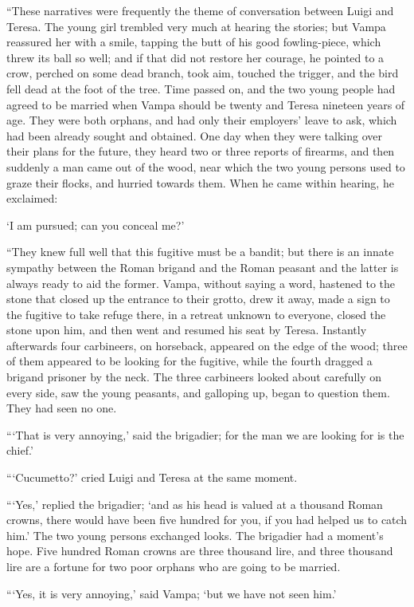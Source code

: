 “These narratives were frequently the theme of conversation between
Luigi and Teresa. The young girl trembled very much at hearing the
stories; but Vampa reassured her with a smile, tapping the butt of his
good fowling-piece, which threw its ball so well; and if that did not
restore her courage, he pointed to a crow, perched on some dead branch,
took aim, touched the trigger, and the bird fell dead at the foot of
the tree. Time passed on, and the two young people had agreed to be
married when Vampa should be twenty and Teresa nineteen years of age.
They were both orphans, and had only their employers’ leave to ask,
which had been already sought and obtained. One day when they were
talking over their plans for the future, they heard two or three
reports of firearms, and then suddenly a man came out of the wood, near
which the two young persons used to graze their flocks, and hurried
towards them. When he came within hearing, he exclaimed:

‘I am pursued; can you conceal me?’

“They knew full well that this fugitive must be a bandit; but there is
an innate sympathy between the Roman brigand and the Roman peasant and
the latter is always ready to aid the former. Vampa, without saying a
word, hastened to the stone that closed up the entrance to their
grotto, drew it away, made a sign to the fugitive to take refuge there,
in a retreat unknown to everyone, closed the stone upon him, and then
went and resumed his seat by Teresa. Instantly afterwards four
carbineers, on horseback, appeared on the edge of the wood; three of
them appeared to be looking for the fugitive, while the fourth dragged
a brigand prisoner by the neck. The three carbineers looked about
carefully on every side, saw the young peasants, and galloping up,
began to question them. They had seen no one.

“‘That is very annoying,’ said the brigadier; for the man we are
looking for is the chief.’

“‘Cucumetto?’ cried Luigi and Teresa at the same moment.

“‘Yes,’ replied the brigadier; ‘and as his head is valued at a thousand
Roman crowns, there would have been five hundred for you, if you had
helped us to catch him.’ The two young persons exchanged looks. The
brigadier had a moment’s hope. Five hundred Roman crowns are three
thousand lire, and three thousand lire are a fortune for two poor
orphans who are going to be married.

“‘Yes, it is very annoying,’ said Vampa; ‘but we have not seen him.’

